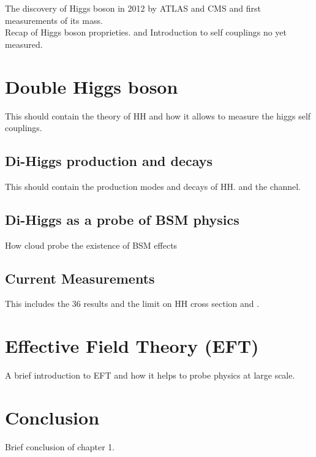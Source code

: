 The discovery of Higgs boson in 2012 by ATLAS and CMS and first measurements of its mass.\\
Recap of Higgs boson proprieties. and Introduction to self couplings no yet measured.

\section{Double Higgs boson}
\label{chap1:HH}

This should contain the theory of HH and how it allows to measure the higgs self couplings.

\subsection{Di-Higgs production and decays}
\label{chap1:HH:HPD}

This should contain the production modes and decays of HH. and the \HHyybb channel.

\subsection{Di-Higgs as a probe of BSM physics}
\label{chap1:HH:BSM}
How \kl cloud probe the existence of BSM effects

\subsection{Current Measurements}
\label{chap1:HH:CM}
This includes the 36 \ifb results and the limit on HH cross section and \kl.

\section{Effective Field Theory (EFT)}
\label{chap1:EFT}

A brief introduction to EFT and how it helps to probe physics at large scale.\\

\section{Conclusion}
\label{chap1:Conc}

Brief conclusion of chapter 1.




